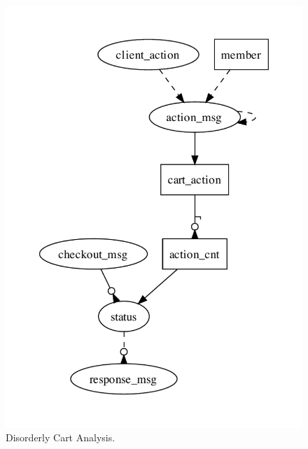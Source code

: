 \begin{figure}[t]
\centering
\includegraphics[width=0.7\linewidth]{fig/disorderly.pdf}
\vspace{-10pt}
\caption{Disorderly Cart Analysis.}
\label{fig:pdg-disorderly-analysis}
\vspace{-2pt}
\end{figure}


